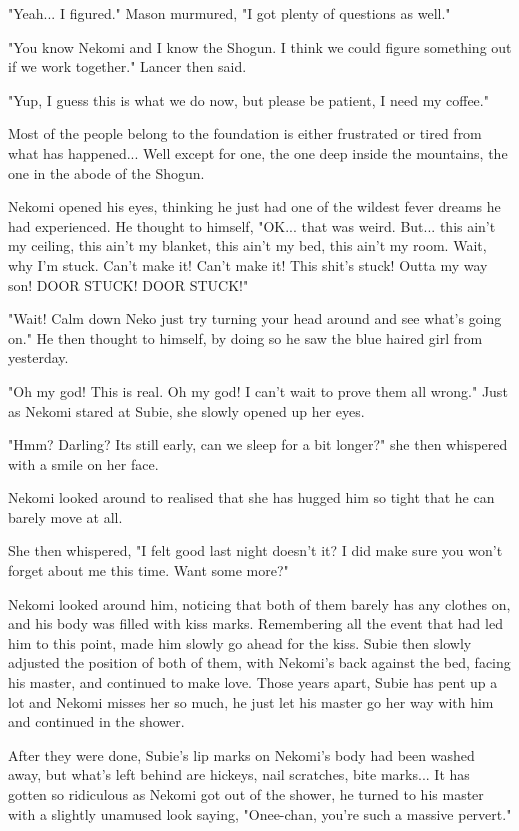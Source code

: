 "Yeah... I figured." Mason murmured, "I got plenty of questions as well."

"You know Nekomi and I know the Shogun. I think we could figure something out if we work together." Lancer then said. 

"Yup, I guess this is what we do now, but please be patient, I need my coffee."

Most of the people belong to the foundation is either frustrated or tired from what has happened... Well except for one, the one deep inside the mountains, the one in the abode of the Shogun. 

Nekomi opened his eyes, thinking he just had one of the wildest fever dreams he had experienced. He thought to himself, "OK... that was weird. But... this ain't my ceiling, this ain't my blanket, this ain't my bed, this ain't my room. Wait, why I'm stuck. Can't make it! Can't make it! This shit's stuck! Outta my way son! DOOR STUCK! DOOR STUCK!"

"Wait! Calm down Neko just try turning your head around and see what's going on." He then thought to himself, by doing so he saw the blue haired girl from yesterday. 

"Oh my god! This is real. Oh my god! I can't wait to prove them all wrong." Just as Nekomi stared at Subie, she slowly opened up her eyes. 

"Hmm? Darling? Its still early, can we sleep for a bit longer?" she then whispered with a smile on her face. 

Nekomi looked around to realised that she has hugged him so tight that he can barely move at all. 

She then whispered, "I felt good last night doesn't it? I did make sure you won't forget about me this time. Want some more?"

Nekomi looked around him, noticing that both of them barely has any clothes on, and his body was filled with kiss marks. Remembering all the event that had led him to this point, made him slowly go ahead for the kiss. Subie then slowly adjusted the position of both of them, with Nekomi's back against the bed, facing his master, and continued to make love. Those years apart, Subie has pent up a lot and Nekomi misses her so much, he just let his master go her way with him and continued in the shower.

After they were done, Subie's lip marks on Nekomi's body had been washed away, but what's left behind are hickeys, nail scratches, bite marks... It has gotten so ridiculous as Nekomi got out of the shower, he turned to his master with a slightly unamused look saying, "Onee-chan, you're such a massive pervert."

